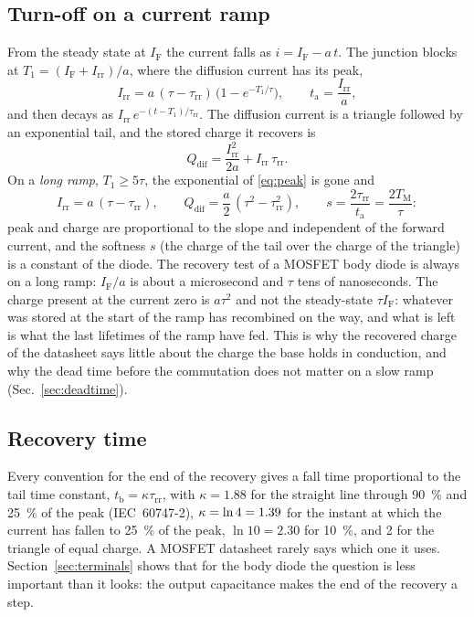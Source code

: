 \documentclass[10pt,a4paper]{scrartcl}
\newcommand{\IF}{I_\mathrm{F}}
\newcommand{\Irr}{I_\mathrm{rr}}
\newcommand{\Qdif}{Q_\mathrm{dif}}
\newcommand{\ta}{t_\mathrm{a}}
\newcommand{\tb}{t_\mathrm{b}}
\newcommand{\taurr}{\tau_\mathrm{rr}}
\newcommand{\TM}{T_\mathrm{M}}
\newcommand{\Tone}{T_1}
\begin{document}
\subsection{Turn-off on a current ramp}
\label{sec:ramp}
From the steady state at $\IF$ the current falls as $i = \IF - a\,t$. The junction blocks at $\Tone = (\IF+\Irr)/a$, where the diffusion current has its peak,
\begin{equation}
\Irr = a\,(\tau-\taurr)\,\bigl(1 - e^{-\Tone/\tau}\bigr) , \qquad \ta = \frac{\Irr}{a} ,
\label{eq:peak}
\end{equation}
and then decays as $\Irr\,e^{-(t-\Tone)/\taurr}$. The diffusion current is a triangle followed by an exponential tail, and the stored charge it recovers is
\begin{equation}
\Qdif = \frac{\Irr^2}{2a} + \Irr\,\taurr .
\label{eq:qdif}
\end{equation}
On a \emph{long ramp}, $\Tone \geq 5\tau$, the exponential of \eqref{eq:peak} is gone and
\begin{equation}
\Irr = a\,(\tau-\taurr) , \qquad \Qdif = \frac{a}{2}\,(\tau^2 - \taurr^2) , \qquad s = \frac{2\taurr}{\ta} = \frac{2\TM}{\tau} :
\label{eq:long}
\end{equation}
peak and charge are proportional to the slope and independent of the forward current, and the softness $s$ (the charge of the tail over the charge of the triangle) is a constant of the diode. The recovery test of a MOSFET body diode is always on a long ramp: $\IF/a$ is about a microsecond and $\tau$ tens of nanoseconds. The charge present at the current zero is $a\tau^2$ and not the steady-state $\tau\IF$: whatever was stored at the start of the ramp has recombined on the way, and what is left is what the last lifetimes of the ramp have fed. This is why the recovered charge of the datasheet says little about the charge the base holds in conduction, and why the dead time before the commutation does not matter on a slow ramp (Sec.~\ref{sec:deadtime}).

\subsection{Recovery time}
Every convention for the end of the recovery gives a fall time proportional to the tail time constant, $\tb = \kappa\taurr$, with $\kappa = 1.88$ for the straight line through \SI{90}{\percent} and \SI{25}{\percent} of the peak (IEC~60747-2), $\kappa = \ln 4 = 1.39$ for the instant at which the current has fallen to \SI{25}{\percent} of the peak, $\ln 10 = 2.30$ for \SI{10}{\percent}, and 2 for the triangle of equal charge. A MOSFET datasheet rarely says which one it uses. Section~\ref{sec:terminals} shows that for the body diode the question is less important than it looks: the output capacitance makes the end of the recovery a step.
\end{document}

